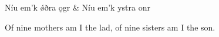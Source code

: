 
\bva Níu em’k ǿðra ǫgr &
Níu em’k ystra onr\eva

\bvb Of nine mothers am I the lad, of nine sisters am I the son.\evb
\evg
